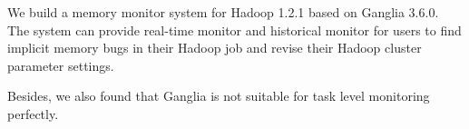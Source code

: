We build a memory monitor system for Hadoop 1.2.1 based on Ganglia 3.6.0. The system can provide real-time monitor and historical monitor for users to find implicit memory bugs in their Hadoop job and revise their Hadoop cluster parameter settings.

Besides, we also found that Ganglia is not suitable for task level monitoring perfectly. 